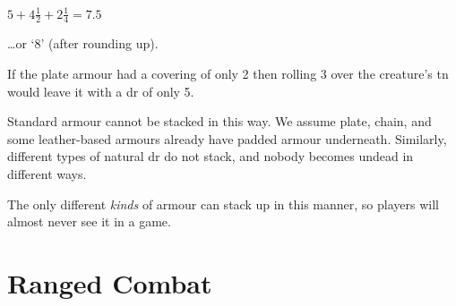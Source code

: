 \begin{multicols}{2}
\begin{center}
{
  \LARGE $5 + $\Large$4\frac{1}{2} + $\normalsize$2\frac{1}{4} =  7.5$
}
\end{center}

\ldots or `8' (after rounding up).

If the plate armour had a covering of only 2 then rolling 3 over the creature's \gls{tn} would leave it with a \gls{dr} of only 5.

Standard armour cannot be stacked in this way.
We assume plate, chain, and some leather-based armours already have padded armour underneath.
Similarly, different types of natural \gls{dr} do not stack, and nobody becomes undead in different ways.

The only different \emph{kinds} of armour can stack up in this manner, so players will almost never see it in a game.

\end{multicols}

\section{Ranged Combat}

